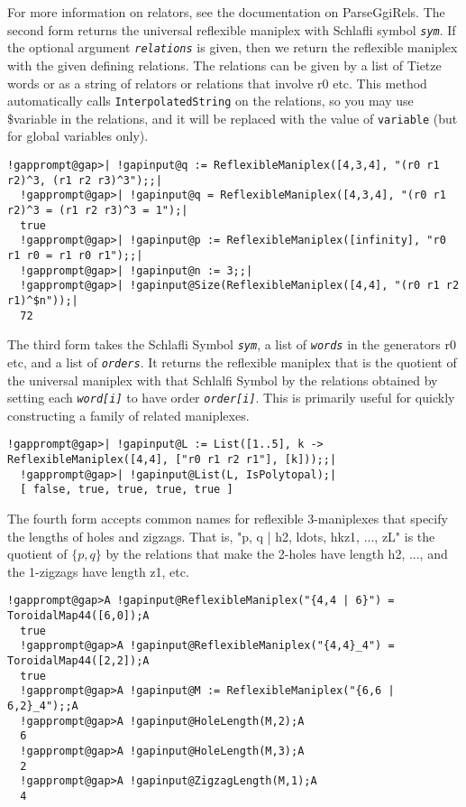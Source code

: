 \documentclass[a4paper,11pt]{report}
\begin{document}
{{{ For more information on relators, see the documentation on ParseGgiRels. The
second form returns the universal reflexible maniplex with Schlafli symbol \mbox{\texttt{\mdseries\slshape sym}}. If the optional argument \mbox{\texttt{\mdseries\slshape relations}} is given, then we return the reflexible maniplex with the given defining
relations. The relations can be given by a list of Tietze words or as a string
of relators or relations that involve r0 etc. This method automatically calls \texttt{InterpolatedString} on the relations, so you may use \$variable in the relations, and it will be
replaced with the value of \texttt{variable} (but for global variables only). 
\begin{Verbatim}[commandchars=!@|,fontsize=\small,frame=single,label=Example]
  !gapprompt@gap>| !gapinput@q := ReflexibleManiplex([4,3,4], "(r0 r1 r2)^3, (r1 r2 r3)^3");;|
  !gapprompt@gap>| !gapinput@q = ReflexibleManiplex([4,3,4], "(r0 r1 r2)^3 = (r1 r2 r3)^3 = 1");|
  true
  !gapprompt@gap>| !gapinput@p := ReflexibleManiplex([infinity], "r0 r1 r0 = r1 r0 r1");;|
  !gapprompt@gap>| !gapinput@n := 3;;|
  !gapprompt@gap>| !gapinput@Size(ReflexibleManiplex([4,4], "(r0 r1 r2 r1)^$n"));|
  72
\end{Verbatim}
 The third form takes the Schlafli Symbol \mbox{\texttt{\mdseries\slshape sym}}, a list of \mbox{\texttt{\mdseries\slshape words}} in the generators r0 etc, and a list of \mbox{\texttt{\mdseries\slshape orders}}. It returns the reflexible maniplex that is the quotient of the universal
maniplex with that Schlalfi Symbol by the relations obtained by setting each \mbox{\texttt{\mdseries\slshape word[i]}} to have order \mbox{\texttt{\mdseries\slshape order[i]}}. This is primarily useful for quickly constructing a family of related
maniplexes. 
\begin{Verbatim}[commandchars=!@|,fontsize=\small,frame=single,label=Example]
  !gapprompt@gap>| !gapinput@L := List([1..5], k -> ReflexibleManiplex([4,4], ["r0 r1 r2 r1"], [k]));;|
  !gapprompt@gap>| !gapinput@List(L, IsPolytopal);|
  [ false, true, true, true, true ]
\end{Verbatim}
 

 The fourth form accepts common names for reflexible 3-maniplexes that specify
the lengths of holes and zigzags. That is, "\texttt{}p, q | h2,
\texttt{}ldots,
hk\texttt{}\texttt{}{\textunderscore}z1, ..., zL" is
the quotient of $\{p,q\}$ by the relations that make the 2-holes have length h2, ..., and the 1-zigzags
have length z1, etc. 
\begin{Verbatim}[commandchars=!@A,fontsize=\small,frame=single,label=Example]
  !gapprompt@gap>A !gapinput@ReflexibleManiplex("{4,4 | 6}") = ToroidalMap44([6,0]);A
  true
  !gapprompt@gap>A !gapinput@ReflexibleManiplex("{4,4}_4") = ToroidalMap44([2,2]);A
  true
  !gapprompt@gap>A !gapinput@M := ReflexibleManiplex("{6,6 | 6,2}_4");;A
  !gapprompt@gap>A !gapinput@HoleLength(M,2);A
  6
  !gapprompt@gap>A !gapinput@HoleLength(M,3);A
  2
  !gapprompt@gap>A !gapinput@ZigzagLength(M,1);A
  4
\end{Verbatim}
 }

}}
\end{document}
